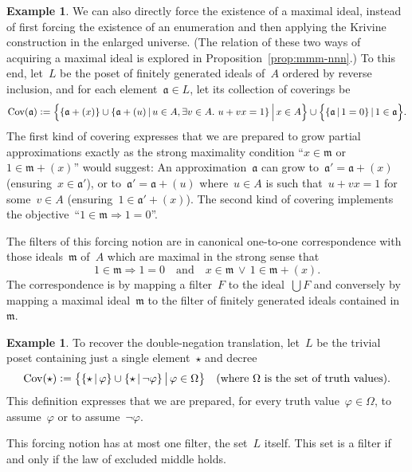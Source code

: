 \documentclass[com,11pt,crcready]{iosart2x}
\theoremstyle{definition}
\newtheorem{example}[definition]{Example}
\theoremstyle{plain}
\theoremstyle{remark}
\newcommand{\aaa}{\mathfrak{a}}
\newcommand{\mmm}{\mathfrak{m}}
\newcommand{\defeq}{\vcentcolon=}
\newcommand{\Cov}{\mathrm{Cov}}
\renewcommand{\_}{\mathpunct{.}\,}
\begin{document}
\begin{example}\label{ex:notion-max}We can also directly force the existence of a maximal ideal,
instead of first forcing the existence of an enumeration and then applying the
Krivine construction in the enlarged universe. (The relation of these two ways
of acquiring a maximal ideal is explored in
Proposition~\ref{prop:mmm-nnn}.) To this end, let~$L$ be the
poset of finitely generated ideals of~$A$ ordered by reverse inclusion,
and for each element~$\aaa \in L$, let its collection of coverings be
\[\Cov(\aaa) \defeq
  \Bigl\{ \{ \aaa + (x) \} \cup \{ \aaa + (u) \,|\, u \in A, \exists v \in A\_ u + vx = 1 \}
  \,\Big|\, x \in A \Bigr\}
  \cup
  \Bigl\{ \{ \aaa \,|\, 1 = 0 \} \,|\, 1 \in \aaa \Bigr\}.
\]
The first kind of covering expresses that we are prepared to grow partial
approximations exactly as the strong maximality condition ``$x \in \mmm$ or~$1
\in \mmm + (x)$'' would suggest: An approximation~$\aaa$ can grow
to~$\aaa' = \aaa+(x)$ (ensuring~$x \in \aaa'$), or to~$\aaa' = \aaa+(u)$
where~$u \in A$ is such that~$u + vx = 1$ for some~$v \in A$ (ensuring~$1 \in
\aaa' + (x)$). The second kind of covering implements the objective~``$1 \in \mmm
\Rightarrow 1 = 0$''.

The filters of this forcing notion
are in canonical one-to-one correspondence with
those ideals~$\mmm$ of~$A$ which are maximal in the strong sense that
\[
  1 \in \mmm \Longrightarrow 1 = 0
    \quad\text{and}\quad
  x \in \mmm \,\vee\, 1 \in \mmm + (x).
\]
The correspondence is by mapping a filter~$F$ to the ideal~$\bigcup F$
and conversely by mapping a maximal ideal~$\mmm$ to the filter of finitely
generated ideals contained in~$\mmm$.
\end{example}

\begin{example}\label{ex:notion-negneg}To recover the double-negation translation, let~$L$ be the
trivial poset containing just a single element~$\star$ and decree
\[ \Cov(\star) \defeq \bigl\{ \{ \star \,|\, \varphi \} \cup \{ \star \,|\, \neg\varphi \} \,\big|\, \varphi \in \Omega \bigr\}
\quad\text{(where~$\Omega$ is the set of truth values).} \]
This definition expresses that we are prepared, for every truth value~$\varphi
\in \Omega$, to assume~$\varphi$ or to assume~$\neg\varphi$.

This forcing notion has at most one filter, the set~$L$ itself. This set is a
filter if and only if the law of excluded middle holds.
\end{example}
\end{document}
